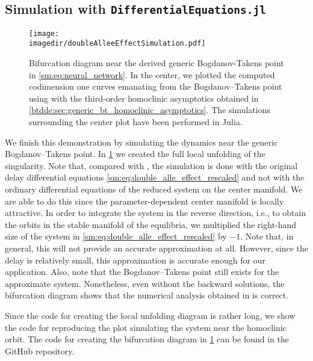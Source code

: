 \subsection{Simulation with {\tt DifferentialEquations.jl}}
%
\begin{figure}[ht!]
    \centering
    \texttt{[image: \\imagedir/doubleAlleeEffectSimulation.pdf]}
    \caption{Bifurcation diagram near the derived generic Bogdanov-Takens
        point in \cref{sm:eq:neural_network}. In the center, we plotted the
        computed codimension one curves emanating from the Bogdanov--Takens
        point using \DDEBIFTOOL with the third-order homoclinic asymptotics
        obtained in \cref{btdde:sec:generic_bt_homoclinic_asymptotics}. The simulations
        surrounding the center plot have been performed in Julia.}
    \label{sm:fig:double_alle_effect-bifurcation-diagram}
\end{figure}
%
We finish this demonstration by simulating the dynamics near the generic
Bogdanov--Takens point. In \cref{sm:fig:double_alle_effect-bifurcation-diagram}
we created the full local unfolding of the singularity. Note
that, compared with \cite{Jiao2021}, the simulation is done with the original
delay differential equations \cref{sm:eq:double_alle_effect_rescaled} and not
with the ordinary differential equations of the reduced system on the center
manifold. We are able to do this since the parameter-dependent center manifold
is locally attractive. In order to integrate the system in the reverse direction, i.e.,
to obtain the orbits in the stable manifold of the equilibria, we multiplied 
the right-hand size of the system in \cref{sm:eq:double_alle_effect_rescaled} by $-1$.
Note that, in general, this will not provide an accurate approximation at all.
However, since the delay is relatively small, this approximation is accurate
enough for our application. Also, note that the Bogdanov--Takens point still
exists for the approximate system. Nonetheless, even without the backward solutions,
the bifurcation diagram shows that the numerical analysis obtained in
\DDEBIFTOOL is correct.

Since the code for creating the local unfolding diagram is
rather long, we show the code for reproducing the plot simulating the system
near the homoclinic orbit. The code for creating the bifurcation diagram in
\cref{sm:fig:double_alle_effect-bifurcation-diagram} can be found in the
GitHub repository.

